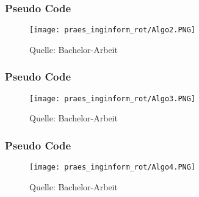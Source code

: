 \documentclass[notes=show]{beamer}
\begin{document}
\begin{frame}
  \frametitle{Pseudo Code}
\vspace{-2.6cm}
\vspace{2.5cm}
  \begin{figure}
  \hspace{4cm}
  \texttt{[image: praes\_inginform\_rot/Algo2.PNG]}
  \caption{Quelle: Bachelor-Arbeit}
  \label{fig:distributionALL}
\end{figure}
\end{frame}

\begin{frame}
  \frametitle{Pseudo Code}
\vspace{-2.6cm}
\vspace{2.5cm}
  \begin{figure}
  \hspace{4cm}
  \texttt{[image: praes\_inginform\_rot/Algo3.PNG]}
  \caption{Quelle: Bachelor-Arbeit}
  \label{fig:distributionALL}
\end{figure}
\end{frame}

\begin{frame}
  \frametitle{Pseudo Code}
\vspace{-2.6cm}
\vspace{2.5cm}
  \begin{figure}
  \hspace{4cm}
  \texttt{[image: praes\_inginform\_rot/Algo4.PNG]}
  \caption{Quelle: Bachelor-Arbeit}
  \label{fig:distributionALL}
\end{figure}
\end{frame}
\end{document}
